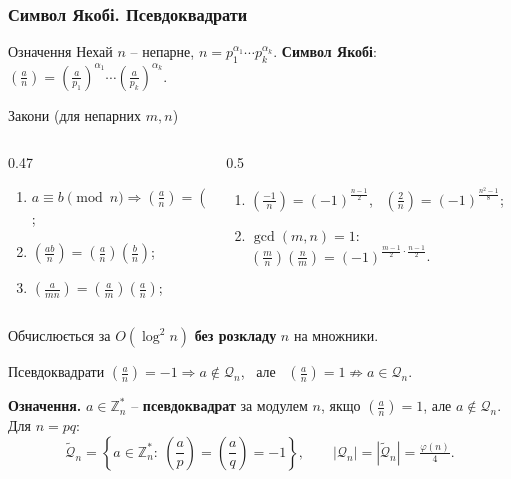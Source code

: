 \documentclass{../zkdl-presentation-template}
\newcommand{\legendre}[2]{\left(\frac{#1}{#2}\right)}
\newcommand{\QR}{\mathcal{Q}}
\newcommand{\PSQ}{\widetilde{\mathcal{Q}}}
\begin{document}
\begin{frame}
    \frametitle{Символ Якобі. Псевдоквадрати}
    \footnotesize
    \begin{block}{Означення}
        Нехай $n$ -- непарне, $n=p_1^{\alpha_1}\cdots p_k^{\alpha_k}$. \textbf{Символ Якобі}: \
        $\legendre{a}{n}=\legendre{a}{p_1}^{\alpha_1}\cdots\legendre{a}{p_k}^{\alpha_k}$.
    \end{block}
    \vspace{-2mm}
    \begin{exampleblock}{Закони \normalfont(для непарних $m,n$)}
        \begin{columns}[T]
            \begin{column}{0.47\textwidth}
                \begin{enumerate}[itemsep=1pt]
                    \item $a\equiv b \pmod n\Rightarrow\legendre{a}{n}=\legendre{b}{n}$;
                    \item $\legendre{ab}{n}=\legendre{a}{n}\legendre{b}{n}$;
                    \item $\legendre{a}{mn}=\legendre{a}{m}\legendre{a}{n}$;
                \end{enumerate}
            \end{column}
            \begin{column}{0.5\textwidth}
                \begin{enumerate}[start=4,itemsep=1pt]
                    \item $\legendre{-1}{n}=(-1)^{\frac{n-1}{2}}$, \ $\legendre{2}{n}=(-1)^{\frac{n^2-1}{8}}$;
                    \item $\gcd(m,n)=1$: \ $\legendre{m}{n}\legendre{n}{m}=(-1)^{\frac{m-1}{2}\cdot\frac{n-1}{2}}$.
                \end{enumerate}
            \end{column}
        \end{columns}
        Обчислюється за $O(\log^2 n)$ \textbf{без розкладу} $n$ на множники.
    \end{exampleblock}
    \vspace{-2mm}
    \begin{alertblock}{Псевдоквадрати}
        $\legendre{a}{n}=-1\Rightarrow a\notin\QR_n$, \ але \ $\legendre{a}{n}=1\not\Rightarrow a\in\QR_n$.

        \textbf{Означення.} $a\in\mathbb{Z}_n^*$ -- \textbf{псевдоквадрат} за модулем $n$, якщо $\legendre{a}{n}=1$, але $a\notin\QR_n$. Для $n=pq$:
        \vspace{-1mm}
        \begin{equation*}
            \PSQ_n=\left\{a\in\mathbb{Z}_n^*:\ \legendre{a}{p}=\legendre{a}{q}=-1\right\},\qquad |\QR_n|=|\PSQ_n|=\tfrac{\varphi(n)}{4}.
        \end{equation*}
        \vspace{-4mm}
    \end{alertblock}
\end{frame}
\end{document}
